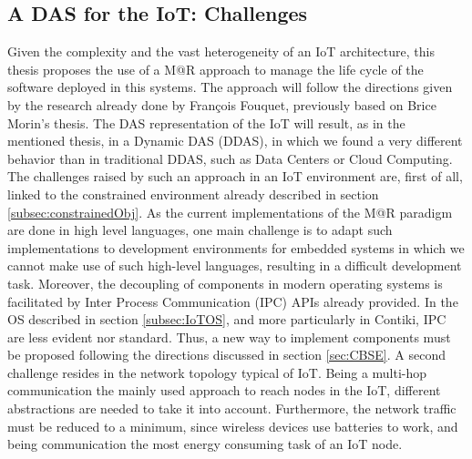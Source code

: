 \subsection{A DAS for the IoT: Challenges}
Given the complexity and the vast heterogeneity of an IoT architecture, this thesis proposes the use of a M@R approach to manage the life cycle of the software deployed in this systems.
The approach will follow the directions given by the research already done by Fran{\c{c}}ois Fouquet\cite{fouquet2013kevoree}, previously based on Brice Morin's thesis\cite{morin2010leveraging}.
The DAS representation of the IoT will result, as in the mentioned thesis, in a Dynamic DAS (DDAS), in which we found a very different behavior than in traditional DDAS, such as Data Centers or Cloud Computing.
The challenges raised by such an approach in an IoT environment are, first of all, linked to the constrained environment already described in section \ref{subsec:constrainedObj}.
As the current implementations of the M@R paradigm are done in high level languages, one main challenge is to adapt such implementations to development environments for embedded systems in which we cannot make use of such high-level languages, resulting in a difficult development task.
Moreover, the decoupling of components in modern operating systems is facilitated by Inter Process Communication (IPC) APIs already provided.
In the OS described in section \ref{subsec:IoTOS}, and more particularly in Contiki, IPC are less evident nor standard.
Thus, a new way to implement components must be proposed following the directions discussed in section \ref{sec:CBSE}.
A second challenge resides in the network topology typical of IoT.
Being a multi-hop communication the mainly used approach to reach nodes in the IoT, different abstractions are needed to take it into account.
Furthermore, the network traffic must be reduced to a minimum, since wireless devices use batteries to work, and being communication the most energy consuming task of an IoT node.

